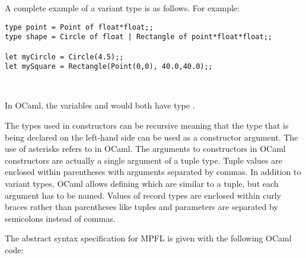 A complete example of a variant type is as follows. For example:
\begin{verbatim}
type point = Point of float*float;;
type shape = Circle of float | Rectangle of point*float*float;;

let myCircle = Circle(4.5);;
let mySquare = Rectangle(Point(0,0), 40.0,40.0);;
\end{verbatim}
\\
\begin{flushleft}
In OCaml, the variables  and  would both have type .
\end{flushleft}
The types used in constructors can be recursive meaning that the type that is being declared on the left-hand side can be used as a constructor argument. The use of asterisks \Code{(*)} refers to  in OCaml. The arguments to constructors in OCaml constructors are actually a single argument of a tuple type. Tuple values are enclosed within parentheses with arguments separated by commas. In addition to variant types, OCaml allows defining  which are similar to a tuple, but each argument has to be named. Values of record types are enclosed within curly braces rather than parentheses like tuples and parameters are separated by semicolons instead of commas.

The abstract syntax specification for MPFL is given with the following OCaml code:

